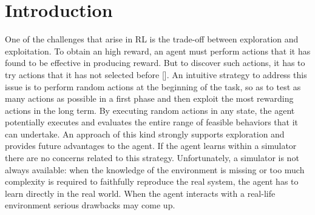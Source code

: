 \chapter{Introduction} \label{ch:intro}

One of the challenges that arise in \acf{RL} is the trade-off between exploration and exploitation. To obtain an high reward, an agent must perform actions that it has found to be effective in producing reward. But to discover such actions, it has to try actions that it has not selected before [\cite{sutton2018reinforcement}]. An intuitive strategy to address this issue is to perform random actions at the beginning of the task, so as to test as many actions as possible in a first phase and then exploit the most rewarding actions in the long term. By executing random actions in any state, the agent potentially executes and evaluates the entire range of feasible behaviors that it can undertake. An approach of this kind strongly supports exploration and provides future advantages to the agent. If the agent learns within a simulator there are no concerns related to this strategy. Unfortunately, a simulator is not always available: when the knowledge of the environment is missing or too much complexity is required to faithfully reproduce the real system, the agent has to learn directly in the real world. When the agent interacts with a real-life environment serious drawbacks may come up.\\
\newline
